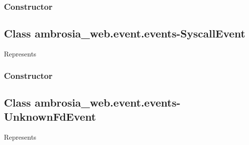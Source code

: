 \documentclass[letterpaper,10pt,english]{sphinxmanual}
\begin{document}
\subsubsection{Constructor}
\label{ambrosia_web.event.events-SuperUserRequestEvent:constructor}

\begin{fulllineitems}
\label{ambrosia_web.event.events-SuperUserRequestEvent:ambrosia_web.event.events-SuperUserRequestEvent}
\end{fulllineitems}



\subsection{Class ambrosia\_web.event.events-SyscallEvent}
\label{ambrosia_web.event.events-SyscallEvent:class-ambrosia-web-event-events-syscallevent}\label{ambrosia_web.event.events-SyscallEvent::doc}
Represents {\hyperref[ambrosia_plugins.lkm:ambrosia_plugins.lkm.events.SyscallEvent]{}}


\subsubsection{Constructor}
\label{ambrosia_web.event.events-SyscallEvent:constructor}

\begin{fulllineitems}
\label{ambrosia_web.event.events-SyscallEvent:ambrosia_web.event.events-SyscallEvent}
\end{fulllineitems}



\subsection{Class ambrosia\_web.event.events-UnknownFdEvent}
\label{ambrosia_web.event.events-UnknownFdEvent:class-ambrosia-web-event-events-unknownfdevent}\label{ambrosia_web.event.events-UnknownFdEvent::doc}
Represents {\hyperref[ambrosia_plugins.lkm:ambrosia_plugins.lkm.events.UnknownFdEvent]{}}
\end{document}
